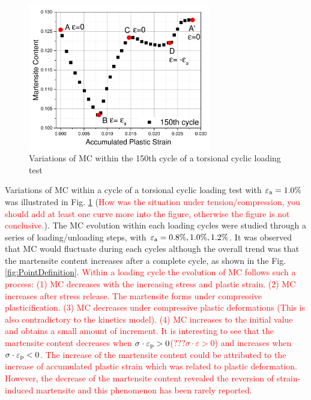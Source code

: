 \documentclass[preprint,5p,twocolumn,10pt,sort&compress]{elsarticle}
\newcommand{\marked}[1]{\textcolor{red}{#1}}
\begin{document}
\begin{figure}[!h]
  \begin{center}
  \includegraphics[width=8cm]{MCvariation.pdf}
  \caption{Variations of MC within the 150th cycle of a torsional cyclic loading test}
  \label{fig:Variations of martensite content}
  \end{center}
\end{figure}


Variations of  MC within a cycle of a torsional cyclic loading test with $\varepsilon_{\rm a}=1.0\%$ was illustrated in Fig. \ref{fig:Variations of martensite content} (\marked{How was the situation under tension/compression, you should add at least one curve more into the figure, otherwise the figure is not conclusive.}).
The MC evolution within each loading cycles were studied through a series of loading/unloading steps, with $\varepsilon_{\rm a}=0.8\%,1.0\%,1.2\%$. It was observed that  MC would fluctuate during each cycles although the overall trend was that the martensite content increases after a complete cycle, as shown in the Fig. \ref{fig:PointDefinition}.
\marked{Within a loading cycle the evolution of MC follows such a process: (1) MC decreases with the increasing stress and plastic strain. (2) MC increases after stress release. The martensite forms under compressive plasticification. (3) MC decreases under compressive plastic deformations \marked{(This is also contradictory to the kinetics model)}.  (4) MC increases to the initial value and obtains a small amount of increment. It is interesting to see that the martensite content decreases when $\sigma \cdot \varepsilon_{\rm p} > 0$(???$\sigma \cdot \varepsilon > 0$)  and increases when  $\sigma \cdot \varepsilon_{\rm p}<0$. The increase of the martensite content could be attributed to the increase of accumulated plastic strain which was related to plastic deformation. However, the decrease of the martensite content revealed the reversion of strain-induced martensite and this phenomenon has been rarely reported. }
\end{document}
